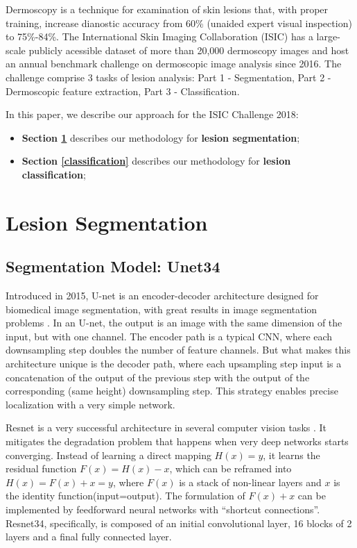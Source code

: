 \documentclass[conference]{IEEEtran}
\begin{document}
Dermoscopy is a technique for examination of skin lesions that, with proper training, increase dianostic accuracy from 60\% (unaided expert visual inspection) to 75\%-84\%\cite{isic}. The International Skin Imaging Collaboration (ISIC) has a large-scale publicly acessible dataset of more than 20,000 dermoscopy images and host an annual benchmark challenge on dermoscopic image analysis since 2016.  The challenge comprise 3 tasks of lesion analysis: Part 1 - Segmentation, Part 2 - Dermoscopic feature extraction, Part 3 - Classification. 

In this paper, we describe our approach for the ISIC Challenge 2018:
\begin{itemize}
\item \textbf{Section \ref{segmentation}} describes our methodology for \textbf{lesion segmentation};
\item \textbf{Section \ref{classification}} describes our methodology for \textbf{lesion classification};
\end{itemize}


\section{Lesion Segmentation}
\label{segmentation}


\subsection{Segmentation Model: Unet34}
Introduced in 2015, U-net is an encoder-decoder architecture designed for biomedical image segmentation\cite{olaf}, with great results in image segmentation problems \cite{iglovikov}. In an U-net, the output is an image with the same dimension of the input, but with one channel.  The encoder path is a typical CNN, where each downsampling step doubles the number of feature channels. But what makes this architecture unique is the decoder path, where each upsampling step input is a concatenation of the output of the previous step with the output of the corresponding (same height) downsampling step. This strategy enables precise localization with a very simple network. 

Resnet is a very successful architecture in several computer vision tasks \cite{he}. It mitigates the degradation problem that happens when very deep networks starts converging. Instead of learning a direct mapping $H(x) = y$, it learns the residual function  $F(x) = H(x)-x$, which can be reframed into $H(x) = F(x)+x = y$, where $F(x)$ is a stack of non-linear layers and $x$ is the identity function(input=output). The formulation of $F(x)+x$ can be implemented by feedforward neural networks with “shortcut connections”. Resnet34, specifically, is composed of an initial convolutional layer, 16 blocks of 2 layers and a final fully connected layer.
\end{document}
